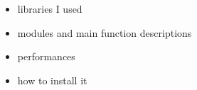 \begin{itemize}
    \item libraries I used
    \item modules and main function descriptions
    \item performances
    \item how to install it
\end{itemize}